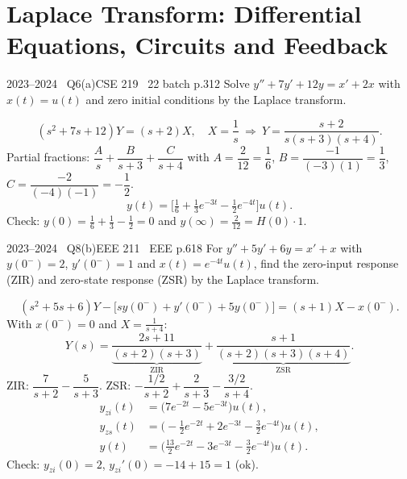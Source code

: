 \renewcommand{\teacherTag}{ASHRAF SIR \textbullet\ LAPLACE IN SYSTEMS}
\chapter{Laplace Transform: Differential Equations, Circuits and Feedback}


\begin{qcard}{2023--2024 \textbullet\ Q6(a)}{CSE 219 \textbullet\ 22 batch p.3}{12}
Solve $y''+7y'+12y=x'+2x$ with $x(t)=u(t)$ and zero initial conditions by the Laplace transform.
\end{qcard}
\begin{solution}
\[(s^2+7s+12)Y=(s+2)X,\quad X=\frac1s\ \Rightarrow\ Y=\frac{s+2}{s(s+3)(s+4)}.\]
Partial fractions: $\dfrac{A}{s}+\dfrac B{s+3}+\dfrac C{s+4}$ with $A=\dfrac2{12}=\dfrac16$, $B=\dfrac{-1}{(-3)(1)}=\dfrac13$, $C=\dfrac{-2}{(-4)(-1)}=-\dfrac12$.
\[y(t)=\Big[\tfrac16+\tfrac13e^{-3t}-\tfrac12e^{-4t}\Big]u(t).\]
Check: $y(0)=\frac16+\frac13-\frac12=0$ and $y(\infty)=\frac{2}{12}=H(0)\cdot1$.
\end{solution}

\begin{qcard}{2023--2024 \textbullet\ Q8(b)}{EEE 211 \textbullet\ EEE p.6}{18}
For $y''+5y'+6y=x'+x$ with $y(0^-)=2$, $y'(0^-)=1$ and $x(t)=e^{-4t}u(t)$, find the zero-input response (ZIR) and zero-state response (ZSR) by the Laplace transform.
\end{qcard}
\begin{solution}
\[(s^2+5s+6)Y-\big[sy(0^-)+y'(0^-)+5y(0^-)\big]=(s+1)X-x(0^-).\]
With $x(0^-)=0$ and $X=\frac1{s+4}$:
\[Y(s)=\underbrace{\frac{2s+11}{(s+2)(s+3)}}_{\text{ZIR}}+\underbrace{\frac{s+1}{(s+2)(s+3)(s+4)}}_{\text{ZSR}} .\]
ZIR: $\dfrac{7}{s+2}-\dfrac5{s+3}$. ZSR: $-\dfrac{1/2}{s+2}+\dfrac2{s+3}-\dfrac{3/2}{s+4}$.
\begin{align*}
y_{zi}(t)&=\big(7e^{-2t}-5e^{-3t}\big)u(t),\\
y_{zs}(t)&=\big(-\tfrac12e^{-2t}+2e^{-3t}-\tfrac32e^{-4t}\big)u(t),\\
y(t)&=\big(\tfrac{13}2e^{-2t}-3e^{-3t}-\tfrac32e^{-4t}\big)u(t).
\end{align*}
Check: $y_{zi}(0)=2$, $y_{zi}'(0)=-14+15=1$ (ok).
\end{solution}

